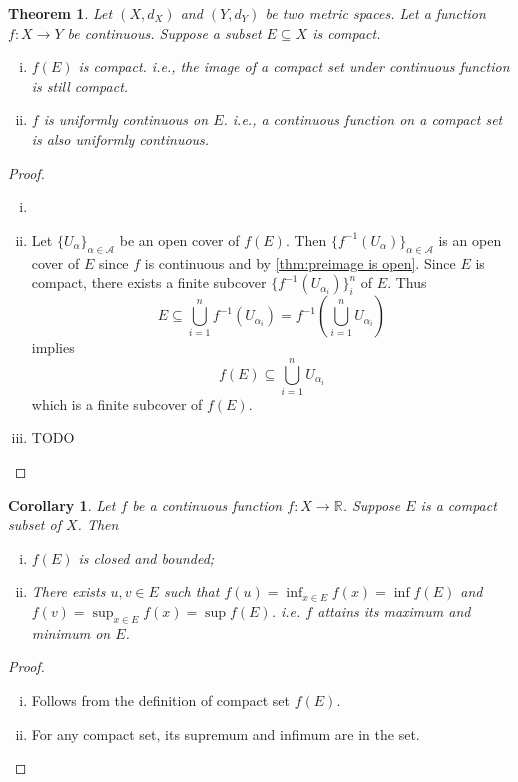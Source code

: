 \documentclass[12pt, lettersize]{book}
\theoremstyle{plain}
\newtheorem{thm}{Theorem}[section]
\newtheorem{cor}{Corollary}[thm]
\theoremstyle{definition}
\theoremstyle{remark}
\newcommand{\R}{\mathbb{R}}
\begin{document}
			\begin{thm}
			Let $(X,d_X)$ and $(Y,d_Y)$ be two metric spaces. Let a function $f:X\rightarrow Y$ be continuous. Suppose a subset $E\subseteq X$ is compact.
			\begin{enumerate}[(i)]
				\item $f(E)$ is compact. i.e., the image of a compact set under continuous function is still compact.
				\item $f$ is uniformly continuous on $E$. i.e., a continuous function on a compact set is also uniformly continuous.
			\end{enumerate}
			\end{thm}
			\begin{proof}
			\begin{enumerate}[(i)]
				\item[]
				\item Let $\{U_\alpha\}_{\alpha\in\mathcal{A}}$ be an open cover of $f(E)$. Then $\{f^{-1}(U_\alpha)\}_{\alpha\in\mathcal{A}}$ is an open cover of $E$ since $f$ is continuous and by \ref{thm:preimage is open}. Since $E$ is compact, there exists a finite subcover $\{f^{-1}(U_{\alpha_i})\}_{i}^{n}$ of $E$. Thus
				\begin{displaymath}
					E\subseteq\bigcup_{i=1}^{n}f^{-1}(U_{\alpha_i})=f^{-1}\left(\bigcup_{i=1}^{n}U_{\alpha_i}\right)
				\end{displaymath}
				implies
				\begin{displaymath}
					f(E)\subseteq \bigcup_{i=1}^{n}U_{\alpha_i}
				\end{displaymath}
				which is a finite subcover of $f(E)$.
				
				\item TODO
			\end{enumerate}
			\end{proof}
			\begin{cor}
			Let $f$ be a continuous function $f:X\rightarrow\R$. Suppose $E$ is a compact subset of $X$. Then
			\begin{enumerate}[(i)]
				\item $f(E)$ is closed and bounded;
				\item There exists $u,v\in E$ such that $f(u)=\inf_{x\in E}f(x)=\inf f(E)$ and $f(v)=\sup_{x\in E}f(x)=\sup f(E)$. i.e. $f$ attains its \emph{maximum} and \emph{minimum} on $E$.
			\end{enumerate}
			\end{cor}
			\begin{proof}
			\begin{enumerate}[(i)]
				\item Follows from the definition of compact set $f(E)$.
				\item For any compact set, its supremum and infimum are in the set.
			\end{enumerate}
			\end{proof}
			
\end{document}

